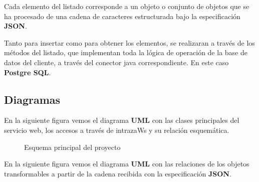 Cada elemento del listado corresponde a un objeto o conjunto de objetos que se ha procesado de una cadena de caracteres estructurada bajo la especificación \textbf{JSON}. 

Tanto para insertar como para obtener los elementos, se realizaran a través de los métodos del listado, que implementan toda la lógica de operación de la base de datos del cliente, a través del conector java correspondiente. En este caso \textbf{Postgre SQL}.

\subsection{Diagramas}

En la siguiente figura vemos el diagrama \textbf{UML} con las clases principales del servicio web, los accesos a través de intrazaWs y su relación esquemática.\\

\begin{figure}[H]
	\centering
	\caption{Esquema principal del proyecto}
	\label{fig:dia-web-ser-gen}
\end{figure}

\pagebreak

En la siguiente figura vemos el diagrama \textbf{UML} con las relaciones de los objetos transformables a partir de la cadena recibida con la especificación \textbf{JSON}.\\

